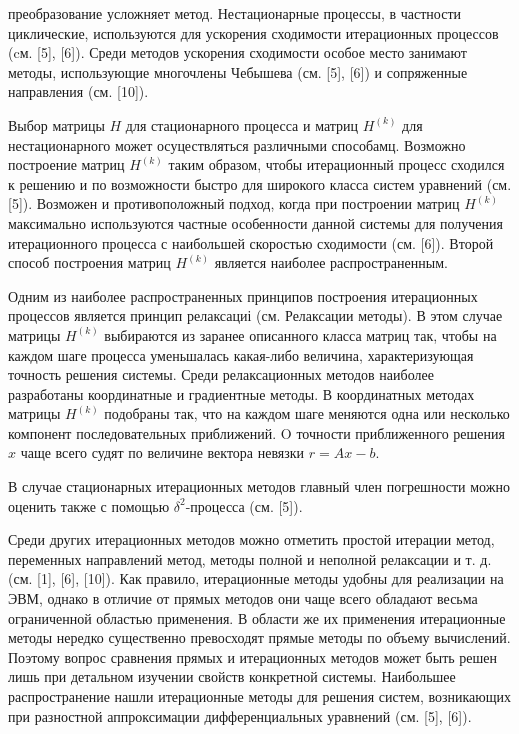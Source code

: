 \documentclass[10pt]{article}
\begin{document}
преобразование усложняет метод. Нестационарные процессы, в частности циклические, используются для ускорения сходимости итерационных процессов (cм. [5], [6]). Среди методов ускорения сходимости особое место занимают методы, использующие многочлены Чебышева (см. [5], [6]) и сопряженные направления (см. [10]).



Выбор матрицы $H$ для стационарного процесса и матриц $H^{(k)}$ для нестационарного может осуцествляться различными способамц. Возможно построение матриц $H^{(k)}$ таким образом, чтобы итерационный процесс сходился к решению и по возможности быстро для широкого класса систем уравнений (см. [5]). Возможен и противоположный подход, когда при построении матриц $H^{(k)}$ максимально используются частные особенности данной системы для получения итерационного процесса с наибольшей скоростью сходимости (см. [6]). Второй способ построения матриц $H^{(k)}$ является наиболее распространенным.



Одним из наиболее распространенных принципов построения итерационных процессов является принцип релаксациі (см. Релаксации методы). В этом случае матрицы $H^{(k)}$ выбираются из заранее описанного класса матриц так, чтобы на каждом шаге процесса уменьшалась какая-либо величина, характеризующая точность решения системы. Среди релаксационных методов наиболее разработаны координатные и градиентные методы. В координатных методах матрицы $H^{(k)}$ подобраны так, что на каждом шаге меняются одна или несколько компонент последовательных приближений. $\mathrm{O}$ точности приближенного решения $x$ чаще всего судят по величине вектора невязки $r=A x-b$.



В случае стационарных итерационных методов главный член погрешности можно оценить также с помощью $\delta^{2}$-процесса (см. [5]).



Среди других итерационных методов можно отметить простой итерации метод, переменных направлений метод, методы полной и неполной релаксации и т. д. (см. [1], [6], [10]). Как правило, итерационные методы удобны для реализации на ЭВМ, однако в отличие от прямых методов они чаще всего обладают весьма ограниченной областью применения. В области же их применения итерационные методы нередко существенно превосходят прямые методы по объему вычислений. Поэтому вопрос сравнения прямых и итерационных методов может быть решен лишь при детальном изучении свойств конкретной системы. Наибольшее распространение нашли итерационные методы для решения систем, возникающих при разностной аппроксимации дифференциальных уравнений (см. [5], [6]).
\end{document}
